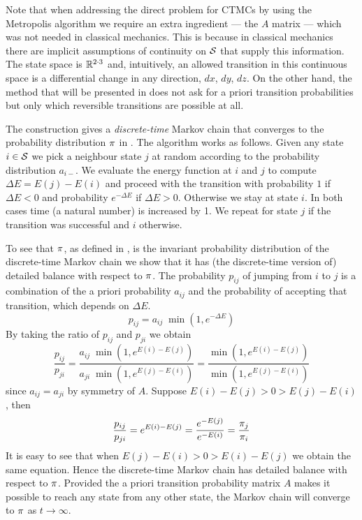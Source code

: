 Note that when addressing the direct problem for CTMCs
by using the Metropolis algorithm
we require an extra ingredient --- the $A$ matrix ---
which was not needed in classical mechanics.
This is because in classical mechanics there are
implicit assumptions of continuity on $\mathcal{S}$
that supply this information.
The state space is $\mathbb{R}^{2 \cdot 3}$
and, intuitively, an allowed transition in this continuous space
is a differential change in any direction,
\ie $dx$, $dy$, $dz$.
%
On the other hand,
the method that will be presented in 
does not ask for a priori transition probabilities
but only which reversible transitions are possible at all.

The construction gives a \emph{discrete-time} Markov chain that
converges to the probability distribution $\pi$ in .
The algorithm works as follows.
Given any state $i \in \mathcal{S}$ we pick a neighbour state $j$
at random according to the probability distribution $a_{i-}$.
We evaluate the energy function at $i$ and $j$
to compute $\Delta E = E(j)-E(i)$ and proceed with the transition
with probability $1$ if $\Delta E < 0$ and
probability $e^{-\Delta E}$ if $\Delta E > 0$.
Otherwise we stay at state $i$.
In both cases time (a natural number) is increased by 1.
We repeat for state $j$ if the transition was successful
and $i$ otherwise.

To see that $\pi$, as defined in ,
is the invariant probability distribution
of the discrete-time Markov chain
we show that it has (the discrete-time version of)
detailed balance with respect to $\pi$.
The probability $p_{ij}$ of jumping from $i$ to $j$ is
a combination of the a priori probability $a_{ij}$ and
the probability of accepting that transition,
which depends on $\Delta E$.
\[ p_{ij} = a_{ij}\; \min(1, e^{-\Delta E}) \]
By taking the ratio of $p_{ij}$ and $p_{ji}$ we obtain
\[ \frac{p_{ij}}{p_{ji}} =
   \frac{a_{ij}\; \min(1, e^{E(i)-E(j)})}{
         a_{ji}\; \min(1, e^{E(j)-E(i)})} =
   \frac{\min(1, e^{E(i)-E(j)})}{
         \min(1, e^{E(j)-E(i)})} \]
since $a_{ij} = a_{ji}$ by symmetry of $A$.
Suppose $E(i)-E(j) > 0 > E(j)-E(i)$, then
\[ \frac{p_{ij}}{p_{ji}} = e^{E(i)-E(j)}
     = \frac{e^{-E(j)}}{e^{-E(i)}} = \frac{\pi_{j}}{\pi_{i}} \]
It is easy to see that when
$E(j)-E(i) > 0 > E(i)-E(j)$ we obtain the same equation.
Hence the discrete-time Markov chain has detailed balance
with respect to $\pi$. %
Provided the a priori transition probability matrix $A$
makes it possible to reach any state from any other state,
the Markov chain will converge to $\pi$ as $t \to \infty$.

